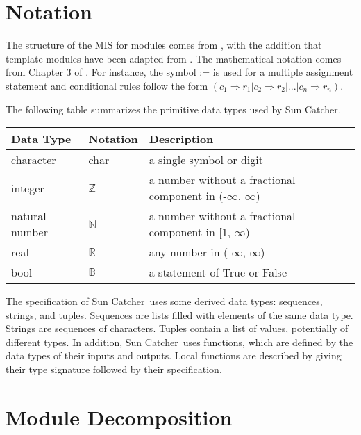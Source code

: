 \documentclass[12pt, titlepage]{article}
\newcommand{\progname}{Sun Catcher}
\begin{document}
\section{Notation}


The structure of the MIS for modules comes from \citet{HoffmanAndStrooper1995},
with the addition that template modules have been adapted from
\cite{GhezziEtAl2003}.  The mathematical notation comes from Chapter 3 of
\citet{HoffmanAndStrooper1995}.  For instance, the symbol := is used for a
multiple assignment statement and conditional rules follow the form $(c_1
\Rightarrow r_1 | c_2 \Rightarrow r_2 | ... | c_n \Rightarrow r_n )$.

The following table summarizes the primitive data types used by \progname. 

\begin{center}
\renewcommand{\arraystretch}{1.2}
\noindent 
\begin{tabular}{l l p{7.5cm}} 
\toprule 
\textbf{Data Type} & \textbf{Notation} & \textbf{Description}\\ 
\midrule
character & char & a single symbol or digit\\
integer & $\mathbb{Z}$ & a number without a fractional component in  (-$\infty$,
$\infty$) \\
natural number & $\mathbb{N}$ & a number without a fractional component in [1,
$\infty$) \\
real & $\mathbb{R}$ & any number in  (-$\infty$, $\infty$)\\
bool &$\mathbb{B}$ & a statement of True or False\\


\bottomrule
\end{tabular} 
\end{center}

\noindent
The specification of \progname \ uses some derived data types: sequences,
strings, and
tuples. Sequences are lists filled with elements of the same data type. Strings
are sequences of characters. Tuples contain a list of values, potentially of
different types. In addition, \progname \ uses functions, which
are defined by the data types of their inputs and outputs. Local functions are
described by giving their type signature followed by their specification.



\section{Module Decomposition}
\end{document}
